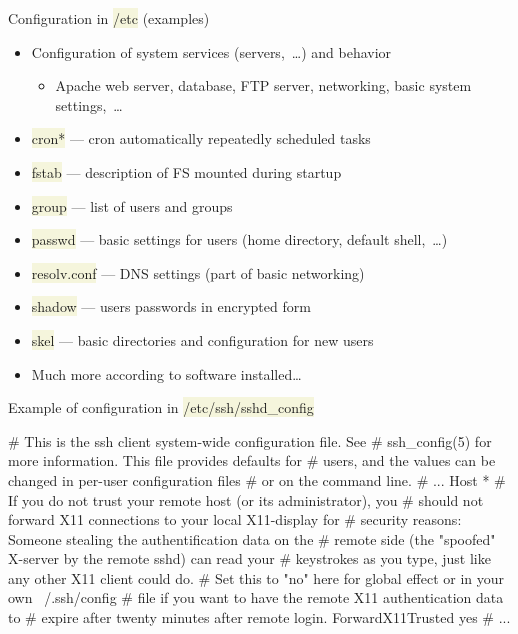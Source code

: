 \documentclass[compress, xelatex, 11pt, xcolor=svgnames, aspectratio=169, url={hyphens, lowtilde}]{beamer}
\renewcommand{\texttt}[1]{\colorbox{Beige}{{\ttfamily #1}}}
\begin{document}
\begin{frame}{Configuration in \texttt{/etc} (examples)}
	\begin{itemize}
		\item Configuration of system services (servers,~\ldots) and behavior
		\begin{itemize}
			\item Apache web server, database, FTP server, networking, basic system settings,~\ldots
		\end{itemize}
		\item \texttt{cron*} --- cron automatically repeatedly scheduled tasks
		\item \texttt{fstab} --- description of FS mounted during startup
		\item \texttt{group} --- list of users and groups
		\item \texttt{passwd} --- basic settings for users (home directory, default shell,~\ldots)
		\item \texttt{resolv.conf} ---  DNS settings (part of basic networking)
		\item \texttt{shadow} --- users passwords in encrypted form
		\item \texttt{skel} --- basic directories and configuration for new users
		\item Much more according to software installed\ldots
	\end{itemize}
\end{frame}

\begin{frame}[fragile]{Example of configuration in \texttt{/etc/ssh/sshd\_config}}
	\begin{bashcode}
    # This is the ssh client system-wide configuration file.  See
    # ssh_config(5) for more information.  This file provides defaults for
    # users, and the values can be changed in per-user configuration files
    # or on the command line.
    # ...
    Host *
    # If you do not trust your remote host (or its administrator), you
    # should not forward X11 connections to your local X11-display for
    # security reasons: Someone stealing the authentification data on the
    # remote side (the "spoofed" X-server by the remote sshd) can read your
    # keystrokes as you type, just like any other X11 client could do.
    # Set this to "no" here for global effect or in your own ~/.ssh/config
    # file if you want to have the remote X11 authentication data to
    # expire after twenty minutes after remote login.
    ForwardX11Trusted yes
    # ...
	\end{bashcode}
\end{frame}
\end{document}
